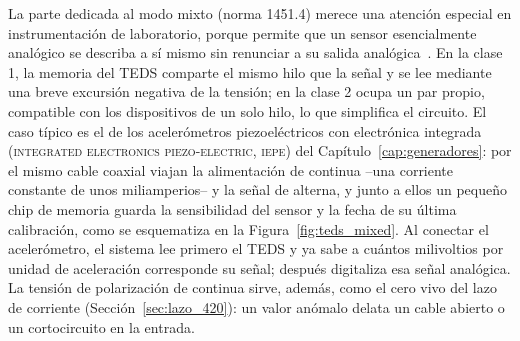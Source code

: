 La parte dedicada al modo mixto (norma 1451.4) merece una atención especial en instrumentación de laboratorio, porque permite que un sensor esencialmente analógico se describa a sí mismo sin renunciar a su salida analógica~\cite{ieee1451_4_2004}. En la clase 1, la memoria del TEDS comparte el mismo hilo que la señal y se lee mediante una breve excursión negativa de la tensión; en la clase 2 ocupa un par propio, compatible con los dispositivos de un solo hilo, lo que simplifica el circuito. El caso típico es el de los acelerómetros piezoeléctricos con electrónica integrada (\textsc{integrated electronics piezo-electric, iepe}) del Capítulo~\ref{cap:generadores}: por el mismo cable coaxial viajan la alimentación de continua --una corriente constante de unos miliamperios-- y la señal de alterna, y junto a ellos un pequeño chip de memoria guarda la sensibilidad del sensor y la fecha de su última calibración, como se esquematiza en la Figura~\ref{fig:teds_mixed}. Al conectar el acelerómetro, el sistema lee primero el TEDS y ya sabe a cuántos milivoltios por unidad de aceleración corresponde su señal; después digitaliza esa señal analógica. La tensión de polarización de continua sirve, además, como el cero vivo del lazo de corriente (Sección~\ref{sec:lazo_420}): un valor anómalo delata un cable abierto o un cortocircuito en la entrada.

\begin{marginfigure}
    \centering
    \caption[Acelerómetro IEPE con TEDS en modo mixto.]{Sensor analógico que se describe a sí mismo: un acelerómetro piezoeléctrico con electrónica integrada (IEPE) y su memoria TEDS. Por el mismo cable coaxial llegan al sensor la alimentación --corriente constante-- y salen la señal de medida y los datos de la memoria. El sistema de adquisición lee primero la hoja de datos electrónica, con la sensibilidad y la fecha de calibración, y solo después convierte la señal analógica.}\label{fig:teds_mixed}
\end{marginfigure}

